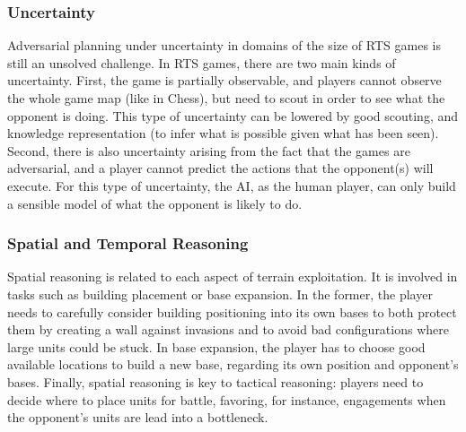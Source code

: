 \documentclass[journal]{IEEEtran}
\begin{document}
\subsubsection{Uncertainty}
Adversarial planning under uncertainty in domains of the size of RTS games is still an unsolved challenge.
In RTS games, there are two main kinds of uncertainty. First, the game is partially observable, and players cannot observe the whole game map (like in Chess), but need to scout in order to see what the opponent is doing. This type of uncertainty can be lowered by good scouting, and knowledge representation (to infer what is possible given what has been seen). Second, there is also uncertainty arising from the fact that the games are adversarial, and a player cannot predict the actions that the opponent(s) will execute. For this type of uncertainty, the AI, as the human player, can only build a sensible model of what the opponent is likely to do. 

\subsubsection{Spatial and Temporal Reasoning}
Spatial reasoning is related to each aspect of terrain exploitation.
It is involved in tasks such as building placement or base expansion. In the
former, the player needs to carefully consider building positioning into its
own bases to both protect them by creating a wall against invasions and to
avoid bad configurations where large units could be stuck. In base
expansion, the player has to choose good available locations to build a new
base, regarding its own position and opponent's bases. Finally, spatial
reasoning is key to tactical reasoning: players need to decide where to place
units for battle, favoring, for instance, engagements when the opponent's
units are lead into a bottleneck. 
\end{document}
